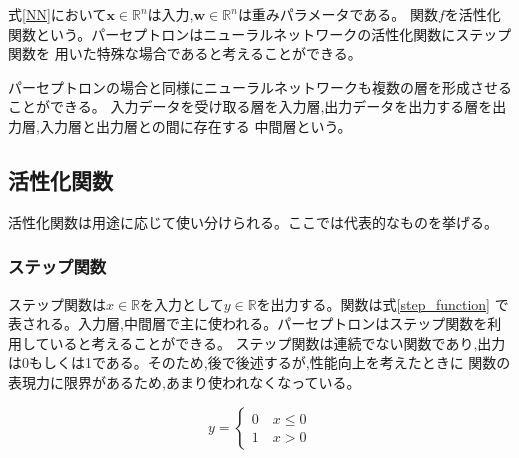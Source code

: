   式\ref{NN}において$\bm{x} \in \mathbb{R}^n$は入力,$\bm{w} \in \mathbb{R}^n$は重みパラメータである。
  関数$f$を活性化関数という。パーセプトロンはニューラルネットワークの活性化関数にステップ関数を
  用いた特殊な場合であると考えることができる。

  パーセプトロンの場合と同様にニューラルネットワークも複数の層を形成させることができる。
  入力データを受け取る層を入力層,出力データを出力する層を出力層,入力層と出力層との間に存在する
  中間層という。

\subsection{活性化関数}
活性化関数は用途に応じて使い分けられる。ここでは代表的なものを挙げる。
\subsubsection{ステップ関数}
ステップ関数は$x\in \mathbb{R}$を入力として$y \in \mathbb{R}$を出力する。関数は式\ref{step_function}
で表される。入力層,中間層で主に使われる。パーセプトロンはステップ関数を利用していると考えることができる。
ステップ関数は連続でない関数であり,出力は0もしくは1である。そのため,後で後述するが,性能向上を考えたときに
関数の表現力に限界があるため,あまり使われなくなっている。

\begin{equation}
  \label{step_function}
  y = \left\{
    \begin{aligned}
      0 \quad x \leq 0 \\
      1 \quad x > 0
    \end{aligned}
  \right.
\end{equation}

